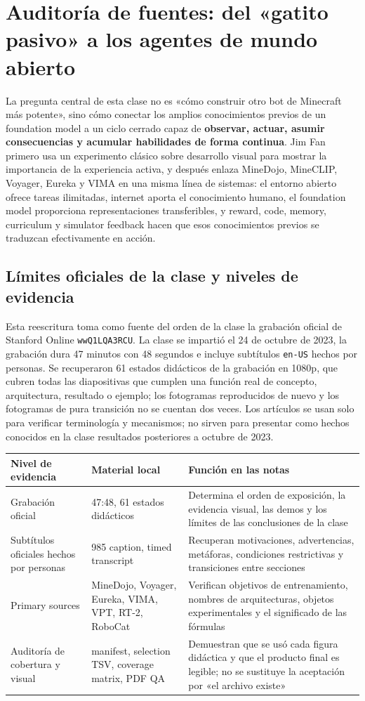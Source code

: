 \section{Auditoría de fuentes: del «gatito pasivo» a los agentes de mundo abierto}

La pregunta central de esta clase no es «cómo construir otro bot de Minecraft más potente», sino cómo conectar los amplios conocimientos previos de un foundation model a un ciclo cerrado capaz de \textbf{observar, actuar, asumir consecuencias y acumular habilidades de forma continua}. Jim Fan primero usa un experimento clásico sobre desarrollo visual para mostrar la importancia de la experiencia activa, y después enlaza MineDojo, MineCLIP, Voyager, Eureka y VIMA en una misma línea de sistemas: el entorno abierto ofrece tareas ilimitadas, internet aporta el conocimiento humano, el foundation model proporciona representaciones transferibles, y reward, code, memory, curriculum y simulator feedback hacen que esos conocimientos previos se traduzcan efectivamente en acción.

\subsection{Límites oficiales de la clase y niveles de evidencia}

Esta reescritura toma como fuente del orden de la clase la grabación oficial de Stanford Online \texttt{wwQ1LQA3RCU}. La clase se impartió el 24 de octubre de 2023, la grabación dura 47 minutos con 48 segundos e incluye subtítulos \texttt{en-US} hechos por personas. Se recuperaron 61 estados didácticos de la grabación en 1080p, que cubren todas las diapositivas que cumplen una función real de concepto, arquitectura, resultado o ejemplo; los fotogramas reproducidos de nuevo y los fotogramas de pura transición no se cuentan dos veces. Los artículos se usan solo para verificar terminología y mecanismos; no sirven para presentar como hechos conocidos en la clase resultados posteriores a octubre de 2023.

\begin{longtable}{@{}L{0.18\textwidth}L{0.31\textwidth}L{0.40\textwidth}@{}}
\toprule
Nivel de evidencia & Material local & Función en las notas \\
\midrule
Grabación oficial & 47:48, 61 estados didácticos & Determina el orden de exposición, la evidencia visual, las demos y los límites de las conclusiones de la clase \\
Subtítulos oficiales hechos por personas & 985 caption, timed transcript & Recuperan motivaciones, advertencias, metáforas, condiciones restrictivas y transiciones entre secciones \\
Primary sources & MineDojo, Voyager, Eureka, VIMA, VPT, RT-2, RoboCat & Verifican objetivos de entrenamiento, nombres de arquitecturas, objetos experimentales y el significado de las fórmulas \\
Auditoría de cobertura y visual & manifest, selection TSV, coverage matrix, PDF QA & Demuestran que se usó cada figura didáctica y que el producto final es legible; no se sustituye la aceptación por «el archivo existe» \\
\bottomrule
\end{longtable}

